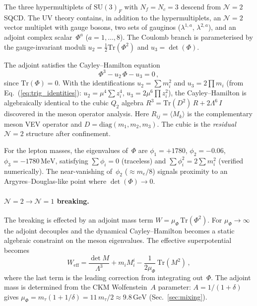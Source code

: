 \documentclass[aps,prd,twocolumn,showpacs,preprintnumbers,superscriptaddress]{revtex4-2}
\newcommand{\SU}{\mathrm{SU}}
\newcommand{\Nc}{N_c}
\newcommand{\Nf}{N_f}
\newcommand{\Tr}{\mathrm{Tr}}
\newcommand{\MeV}{\,\mathrm{MeV}}
\newcommand{\GeV}{\,\mathrm{GeV}}
\begin{document}
The three hypermultiplets of $\SU(3)_F$ with $\Nf = \Nc = 3$
descend from $\mathcal{N}{=}2$ SQCD.  The UV theory contains,
in addition to the hypermultiplets, an $\mathcal{N}{=}2$ vector
multiplet with gauge bosons, two sets of gauginos
($\lambda^{1,a}$, $\lambda^{2,a}$), and an adjoint complex
scalar~$\Phi^a$ ($a = 1,\ldots,8$).
The Coulomb branch is parameterised by the gauge-invariant
moduli $u_2 = \frac{1}{2}\Tr(\Phi^2)$ and $u_3 = \det(\Phi)$.

The adjoint satisfies the Cayley--Hamilton equation
\begin{equation}
  \Phi^3 - u_2\,\Phi - u_3 = 0\,,
  \label{eq:CH}
\end{equation}
since $\Tr(\Phi) = 0$.  With the identifications
$u_2 = \sum m_i^2$ and $u_3 = 2\prod m_i$ (from
Eq.~(\ref{eq:trig_identities}): $u_2 = \mu^4 \sum z_i^4$,
$u_3 = 2\mu^6 \prod z_i^2$), the Cayley--Hamilton is
algebraically identical to the cubic $Q_2$ algebra
$R^3 = \Tr(D^2)\,R + 2\Lambda^6\,I$ discovered in the
meson operator analysis.
Here $R_{ij} = \langle M_k\rangle$ is the complementary meson
VEV operator and $D = \mathrm{diag}(m_1, m_2, m_3)$.
The cubic is the \emph{residual} $\mathcal{N}{=}2$ structure
after confinement.

For the lepton masses, the eigenvalues of~$\Phi$ are
$\phi_1 = +1780$, $\phi_2 = -0.06$, $\phi_3 = -1780\MeV$,
satisfying $\sum\phi_i = 0$ (traceless) and
$\sum\phi_i^2 = 2\sum m_i^2$ (verified numerically).
The near-vanishing of~$\phi_2$ ($\approx m_e/8$) signals
proximity to an Argyres--Douglas-like point where
$\det(\Phi) \to 0$.

\paragraph{$\mathcal{N}{=}2 \to \mathcal{N}{=}1$ breaking.}

The breaking is effected by an adjoint mass term
$W = \mu_\Phi\,\Tr(\Phi^2)$.  For $\mu_\Phi \to \infty$
the adjoint decouples and the dynamical Cayley--Hamilton
becomes a static algebraic constraint on the meson
eigenvalues.  The effective superpotential becomes
\begin{equation}
  W_{\mathrm{eff}} = \frac{\det M}{\Lambda^3} + m_i M^i_i
  - \frac{1}{2\mu_\Phi}\,\Tr(M^2)\,,
\end{equation}
where the last term is the leading correction from integrating
out~$\Phi$.  The adjoint mass is determined from the CKM
Wolfenstein~$A$ parameter:
$A = 1/(1+\delta)$ gives
$\mu_\Phi = m_\tau(1 + 1/\delta) = 11\,m_\tau/2 \approx
9.8\GeV$ (Sec.~\ref{sec:mixing}).
\end{document}
